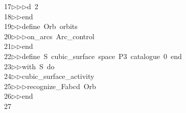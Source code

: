 \begin{tabbing}
17\>$\triangleright$\>$\triangleright$\>$\triangleright$\>d\ 2\ \\[0pt]
18\>$\triangleright$\>$\triangleright$\>end\ \\[0pt]
19\>$\triangleright$\>$\triangleright$\>define\ Orb\ orbits\ \\[0pt]
20\>$\triangleright$\>$\triangleright$\>$\triangleright$\>on\_arcs\ Arc\_control\ \\[0pt]
21\>$\triangleright$\>$\triangleright$\>end\ \\[0pt]
22\>$\triangleright$\>$\triangleright$\>define\ S\ cubic\_surface\ space\ P3\ catalogue\ 0\ end\ \\[0pt]
23\>$\triangleright$\>$\triangleright$\>with\ S\ do\ \\[0pt]
24\>$\triangleright$\>$\triangleright$\>cubic\_surface\_activity\ \\[0pt]
25\>$\triangleright$\>$\triangleright$\>$\triangleright$\>recognize\_Fabcd\ Orb\ \\[0pt]
26\>$\triangleright$\>$\triangleright$\>end\\[0pt]
27\>\end{tabbing}
